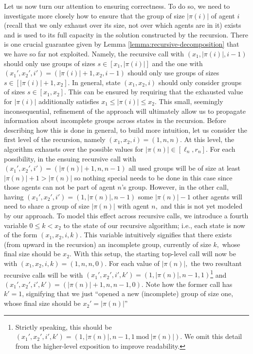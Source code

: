 \documentclass[a4paper,UKenglish,cleveref, autoref, thm-restate]{lipics-v2021}
\newcommand{\modulus}[1]{\vert #1 \vert}
\newcommand{\Mod}[1]{\ \mathrm{mod}\ #1}
\begin{document}
Let us now turn our attention to ensuring correctness. To do so, we need to investigate more closely how to ensure that the group of size $\modulus{\pi(i)}$ of agent $i$ (recall that we only exhaust over its size, not over which agents are in it) exists and is used to its full capacity in the solution constructed by the recursion. There is one crucial guarantee given by Lemma \ref{lemma:recursive-decomposition} that we have so far not exploited. Namely, the recursive call with $(x_1, \modulus{\pi(i)}, i - 1)$ should only use groups of sizes $s \in [x_1, \modulus{\pi(i)}]$ and the one with $(x_1', x_2', i') = (\modulus{\pi(i)} + 1, x_2, i - 1)$ should only use groups of sizes $s \in [\modulus{\pi(i)} + 1, x_2].$ In general, state $(x_1, x_2, i)$ should only consider groups of sizes $s \in [x_1, x_2].$ This can be ensured by requiring that the exhausted value for $\modulus{\pi(i)}$ additionally satisfies $x_1 \leq \modulus{\pi(i)} \leq x_2.$ This small, seemingly inconsequential, refinement of the approach will ultimately allow us to propagate information about incomplete groups across states in the recursion. Before describing how this is done in general, to build more intuition, let us consider the first level of the recursion, namely $(x_1, x_2, i) = (1, n, n).$ At this level, the algorithm exhausts over the possible values for $\modulus{\pi(n)} \in [\ell_n, r_n].$ For each possibility, in the ensuing recursive call with $(x_1', x_2', i') = (\modulus{\pi(n)} + 1, n, n - 1)$ all used groups will be of size at least $\modulus{\pi(n)} + 1 > \modulus{\pi(n)}$ so nothing special needs to be done in this case since those agents can not be part of agent $n$'s group. However, in the other call, having $(x_1', x_2', i') = (1, \modulus{\pi(n)}, n - 1)$ some $\modulus{\pi(n)} - 1$ other agents will need to share a group of size $\modulus{\pi(n)}$ with agent $n,$ and this is not yet modeled by our approach. To model this effect across recursive calls, we introduce a fourth variable $0 \leq k < x_2$ to the state of our recursive algorithm; i.e., each state is now of the form $(x_1, x_2, i, k).$ This variable intuitively signifies that there exists (from upward in the recursion) an incomplete group, currently of size $k,$ whose final size should be $x_2.$ With this setup, the starting top-level call will now be with $(x_1, x_2, i, k) = (1, n, n, 0).$ For each value of $\modulus{\pi(n)},$ the two resultant recursive calls will be with $(x_1', x_2', i', k') = (1, \modulus{\pi(n)}, n - 1, 1)$\footnote{Strictly speaking, this should be $(x_1', x_2', i', k') = (1, \modulus{\pi(n)}, n - 1, 1 \Mod {\modulus{\pi(n)}})$. We omit this detail from the higher-level exposition to improve readability.} and $(x_1', x_2', i', k') = (\modulus{\pi(n)} + 1, n, n - 1, 0).$ Note how the former call has $k' = 1$,  signifying that we just ``opened a new (incomplete) group of size one, whose final size should be $x_2' = \modulus{\pi(n)}$''
\end{document}
